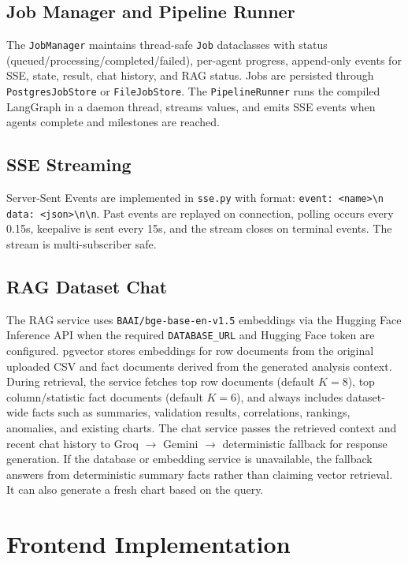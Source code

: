 \documentclass[12pt,a4paper,openany]{report}
\begin{document}
\subsection{Job Manager and Pipeline Runner}
The \texttt{JobManager} maintains thread-safe \texttt{Job} dataclasses with status (queued/processing/completed/failed), per-agent progress, append-only events for SSE, state, result, chat history, and RAG status. Jobs are persisted through \texttt{PostgresJobStore} or \texttt{FileJobStore}. The \texttt{PipelineRunner} runs the compiled LangGraph in a daemon thread, streams values, and emits SSE events when agents complete and milestones are reached.

\subsection{SSE Streaming}
Server-Sent Events are implemented in \texttt{sse.py} with format: \verb|event: <name>\n data: <json>\n\n|. Past events are replayed on connection, polling occurs every 0.15s, keepalive is sent every 15s, and the stream closes on terminal events. The stream is multi-subscriber safe.

\subsection{RAG Dataset Chat}
The RAG service uses \texttt{BAAI/bge-base-en-v1.5} embeddings via the Hugging Face Inference API when the required \texttt{DATABASE\_URL} and Hugging Face token are configured. pgvector stores embeddings for row documents from the original uploaded CSV and fact documents derived from the generated analysis context. During retrieval, the service fetches top row documents (default $K=8$), top column/statistic fact documents (default $K=6$), and always includes dataset-wide facts such as summaries, validation results, correlations, rankings, anomalies, and existing charts. The chat service passes the retrieved context and recent chat history to Groq $\rightarrow$ Gemini $\rightarrow$ deterministic fallback for response generation. If the database or embedding service is unavailable, the fallback answers from deterministic summary facts rather than claiming vector retrieval. It can also generate a fresh chart based on the query.

\section{Frontend Implementation}
\end{document}
